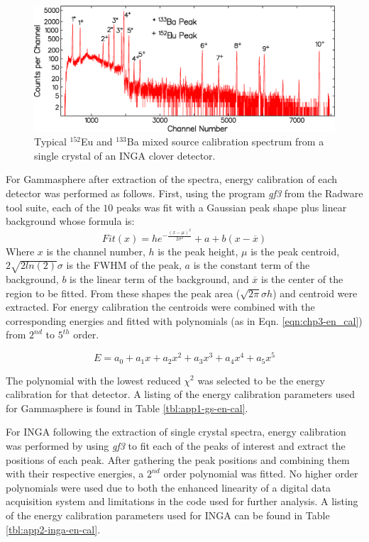 \begin{figure}[h!]
	\centerline{\includegraphics[height=0.25\textheight]{./img/c3/inga_crystal_en_cal.eps}}
	\caption{Typical $^{152}$Eu and $^{133}$Ba mixed source calibration spectrum from a single crystal of an INGA clover detector.\label{fig:chp3-inga-cal-spec}}
\end{figure}

For Gammasphere after extraction of the spectra, energy calibration of each detector was performed as follows. First, using the program \emph{gf3} from the Radware tool suite\cite{radware}, each of the $10$ peaks was fit with a Gaussian peak shape plus linear background whose formula is:
\begin{equation}
\label{eqn:chp3-pk_fit} 
Fit(x) = h e^{-\frac{(x-\mu{})^2}{2\sigma{}^2}} + a + b (x-\overline{x})
\end{equation}
Where $x$ is the channel number, $h$ is the peak height, $\mu{}$ is the peak centroid, $2\sqrt{2ln(2)}\sigma{}$ is the FWHM of the peak, $a$ is the constant term of the background, $b$ is the linear term of the background, and $\overline{x}$ is the center of the region to be fitted. From these shapes the peak area ($\sqrt{2\pi{}}\sigma{}h$) and centroid were extracted. For energy calibration the centroids were combined with the corresponding energies and fitted with polynomials (as in Eqn. \ref{eqn:chp3-en_cal}) from $2^{nd}$ to $5^{th}$ order.

\begin{equation}
\label{eqn:chp3-en_cal} 
E = a_0 + a_1x + a_2x^2 + a_3x^3 + a_4x^4 + a_5x^5
\end{equation}

The polynomial with the lowest reduced $\chi{}^2$ was selected to be the energy calibration for that detector. A listing of the energy calibration parameters used for Gammasphere is found in Table \ref{tbl:app1-gs-en-cal}.

For INGA following the extraction of single crystal spectra, energy calibration was performed by using \emph{gf3} to fit each of the peaks of interest and extract the positions of each peak. After gathering the peak positions and combining them with their respective energies, a $2^{nd}$ order polynomial was fitted. No higher order polynomials were used due to both the enhanced linearity of a digital data acquisition system and limitations in the code used for further analysis. A listing of the energy calibration parameters used for INGA can be found in Table \ref{tbl:app2-inga-en-cal}.

